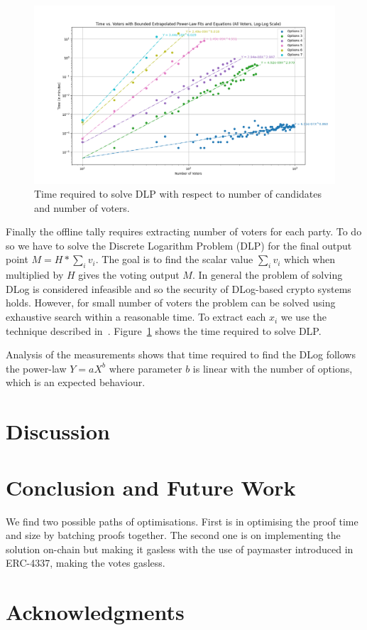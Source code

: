\documentclass{article}
\begin{document}
\begin{figure}
    \centering
    \includegraphics[width=\textwidth]{dlog-search-time.png}
    \caption{Time required to solve DLP with respect to number of candidates and number of voters.}
    \label{fig:dlog-search}
\end{figure}
Finally the offline tally requires extracting number of voters for each party. To do so we have to solve the Discrete Logarithm Problem (DLP) for the final output point $M = H * \sum_i v_i$. The goal is to find the scalar value $\sum_i v_i$ which when multiplied by $H$ gives the voting output $M$. In general the problem of solving DLog is considered infeasible and so the security of DLog-based crypto systems holds. However, for small number of voters the problem can be solved using exhaustive search within a reasonable time. To extract each $x_i$ we use the technique described in~\cite{haoAnonymousVotingTworound2010}. Figure~\ref{fig:dlog-search} shows the time required to solve DLP.

Analysis of the measurements shows that time required to find the DLog follows the power-law $Y=aX^b$ where parameter $b$ is linear with the number of options, which is an expected behaviour.


\section{Discussion}

\section{Conclusion and Future Work}

We find two possible paths of optimisations. First is in optimising the proof time and size by batching proofs together. 
The second one is on implementing the solution on-chain but making it gasless with the use of paymaster introduced in ERC-4337, making the votes gasless.

\section{Acknowledgments}




\end{document}
